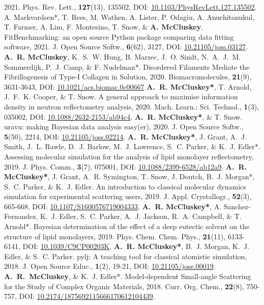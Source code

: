 \begin{benumerate}{25}
    {2021.}
    {Phys. Rev. Lett.,}
    {\textbf{127}(13), 135502,}
    {DOI: \href{https://doi.org/10.1103/PhysRevLett.127.135502}{10.1103/PhysRevLett.127.135502}.}
  \cvpuby
    {A. Markvardsen*, T. Rees, M. Wathen, A. Lister, P. Odagiu, A. Anuchitanukul, T. Farmer, A. Lim, F. Montesino, T. Snow, \& \textbf{A. McCluskey}.}
    {FitBenchmarking: an open source Python package comparing data fitting software,}
    {2021.}
    {J. Open Source Softw.,}
    {\textbf{6}(62), 3127,}
    {DOI: \href{https://doi.org/10.21105/joss.03127}{10.21105/joss.03127}.}
  \cvpuby
    {\textbf{A.~R. McCluskey}, K.~S.~W. Hung, B. Marzec, J.~O. Sindt, N.~A.~J.~M. Sommerdijk, P.~J. Camp, \& F. Nudelman*.}
    {Disordered Filaments Mediate the Fibrillogenesis of Type-I Collagen in Solution,}
    {2020.}
    {Biomacromolecules,}
    {\textbf{21}(9), 3631-3643,}
    {DOI: \href{https://doi.org/10.1021/acs.biomac.0c00667}{10.1021/acs.biomac.0c00667}}
  \cvpuby
    {\textbf{A.~R. McCluskey*}, T. Arnold, J.~F.~K. Cooper, \& T. Snow.}
    {A general approach to maximise information density in neutron reflectometry analysis,}
    {2020.}
    {Mach. Learn.: Sci. Technol.,}
    {\textbf{1}(3), 035002,}
    {DOI: \href{https://doi.org/10.1088/2632-2153/ab94c4}{10.1088/2632-2153/ab94c4}.}
  \cvpuby
    {\textbf{A.~R. McCluskey*}, \& T. Snow.}
    {uravu: making Bayesian data analysis easy(er),}
    {2020.}
    {J. Open Source Softw.,}
    {\textbf{5}(50), 2214,}
    {DOI: \href{https://doi.org/10.21105/joss.02214}{10.21105/joss.02214}.}
  \cvpuby
    {\textbf{A.~R. McCluskey*}, J. Grant, A.~J. Smith, J.~L. Rawle, D.~J. Barlow, M.~J. Lawrence, S.~C. Parker, \& K.~J. Edler*.}
    {Assessing molecular simulation for the analysis of lipid monolayer reflectometry,}
    {2019.}
    {J. Phys. Comm.,}
    {\textbf{3}(7), 075001,}
    {DOI: \href{https://doi.org/10.1088/2399-6528/ab12a9}{10.1088/2399-6528/ab12a9}.}
  \cvpuby
    {\textbf{A.~R. McCluskey*}, J. Grant, A.~R. Symington, T. Snow, J. Doutch, B.~J. Morgan*, S.~C. Parker, \& K.~J. Edler.}
    {An introduction to classical molecular dynamics simulation for experimental scattering users,}
    {2019.}
    {J. Appl. Crystallogr.,}
    {\textbf{52}(3), 665-668,}
    {DOI: \href{https://doi.org/10.1107/S1600576719004333}{10.1107/S1600576719004333}.}
  \cvpuby
    {\textbf{A.~R. McCluskey*}, A. Sanchez-Fernandez, K.~J. Edler, S.~C. Parker, A.~J. Jackson, R.~A. Campbell, \& T. Arnold*.}
    {Bayesian determination of the effect of a deep eutectic solvent on the structure of lipid monolayers,}
    {2019.}
    {Phys. Chem. Chem. Phys.,}
    {\textbf{21}(11), 6133-6141,}
    {DOI: \href{https://doi.org/10.1039/C9CP00203K}{10.1039/C9CP00203K}.}
  \cvpuby
    {\textbf{A.~R. McCluskey*}, B.~J. Morgan, K.~J. Edler, \& S.~C. Parker.}
    {pylj: A teaching tool for classical atomistic simulation,}
    {2018.}
    {J. Open Source Educ.,}
    {\textbf{1}(2), 19-21,}
    {DOI: \href{http://doi.org/10.21105/jose.00019}{10.21105/jose.00019}.}
  \cvpuby
    {\textbf{A.~R.~McCluskey}, \& K.~J. Edler*.}
    {Model-dependent Small-angle Scattering for the Study of Complex Organic Materials,}
    {2018.}
    {Curr. Org. Chem.,}
    {\textbf{22}(8), 750-757,}
    {DOI: \href{http://doi.org/10.2174/1875692115666170612104439}{10.2174/1875692115666170612104439}.}
\end{benumerate}
\vspace{-20pt}
